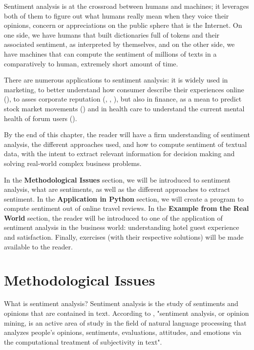 	Sentiment analysis is at the crossroad between humans and machines; it leverages both of them to figure out what humans really mean when they voice their opinions, concern or appreciations on the public sphere that is the Internet. On one side, we have humans that built dictionaries full of tokens and their associated sentiment, as interpreted by themselves, and on the other side, we have machines that can compute the sentiment of millions of texts in a comparatively to human, extremely short amount of time.
	
	There are numerous applications to sentiment analysis: it is widely used in marketing, to better understand how consumer describe their experiences online (\citealp{xiang_what_2015}), to asses corporate reputation (\citealp{oconnor_managing_2010}, \citealp{vidya_twitter_2015}, \citealp{chung_evolution_2019}), but also in finance, as a mean to predict stock market movements (\citealp{mohan_stock_2019}) and in health care to understand the current mental health of forum users (\citealp{davcheva_user_2019}).
	
	By the end of this chapter, the reader will have a firm understanding of sentiment analysis, the different approaches used, and how to compute sentiment of textual data, with the intent to extract relevant information for decision making and solving real-world complex business problems.
	
	In the \textbf{Methodological Issues} section, we will be introduced to sentiment analysis, what are sentiments, as well as the different approaches to extract sentiment. In the \textbf{Application in Python} section, we will create a program to compute sentiment out of online travel reviews. In the \textbf{Example from the Real World} section, the reader will be introduced to one of the application of sentiment analysis in the business world: understanding hotel guest experience and satisfaction. Finally, exercises (with their respective solutions) will be made available to the reader.
	\section{Methodological Issues}

	What is sentiment analysis?
	Sentiment analysis is the study of sentiments and opinions that are contained in text. According to \cite{hutto_vader_2014} \citep{hutto_vader_2014}, "sentiment analysis, or opinion mining, is an active area of study in the field of natural language processing that analyzes people's opinions, sentiments, evaluations, attitudes, and emotions via the computational treatment of subjectivity in text".
	
